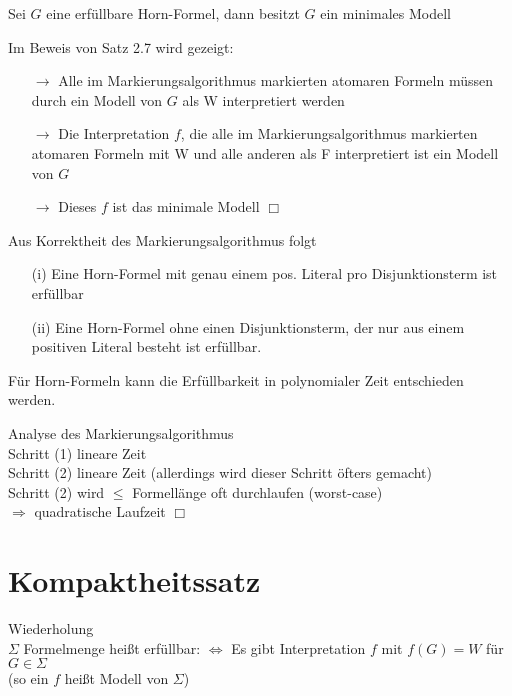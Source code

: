 Sei $G$ eine erfüllbare Horn-Formel, dann besitzt $G$ ein minimales Modell

\beweis{}
Im Beweis von Satz 2.7 wird gezeigt:
\begin{itemize}
\item[$\rightarrow$] Alle im Markierungsalgorithmus markierten atomaren Formeln müssen durch ein Modell von $G$ als W interpretiert werden

\item[$\rightarrow$] Die Interpretation $f$, die alle im Markierungsalgorithmus markierten atomaren Formeln mit W und alle anderen als F interpretiert ist ein Modell von $G$

\item[$\rightarrow$] Dieses $f$ ist das minimale Modell $\Box$
\end{itemize}

\bemerkung{}
Aus Korrektheit des Markierungsalgorithmus folgt
\begin{enumerate}
\item[(i)] Eine Horn-Formel mit genau einem pos. Literal pro Disjunktionsterm ist erfüllbar

\item[(ii)] Eine Horn-Formel ohne einen Disjunktionsterm, der nur aus einem positiven Literal besteht ist erfüllbar.
\end{enumerate}

Für Horn-Formeln kann die Erfüllbarkeit in polynomialer Zeit entschieden werden.

\beweis{}
Analyse des Markierungsalgorithmus\\
Schritt (1) lineare Zeit\\
Schritt (2) lineare Zeit (allerdings wird dieser Schritt öfters gemacht)\\
Schritt (2) wird $\leq$ Formellänge oft durchlaufen (worst-case)\\
$\Rightarrow$ quadratische Laufzeit $\Box$

\newpage

\section{Kompaktheitssatz}

Wiederholung\\
$\Sigma$ Formelmenge heißt erfüllbar: $\Leftrightarrow$ Es gibt Interpretation $f$ mit $f(G) = W$ für $G \in \Sigma$\\
(so ein $f$ heißt Modell von $\Sigma$)\\


